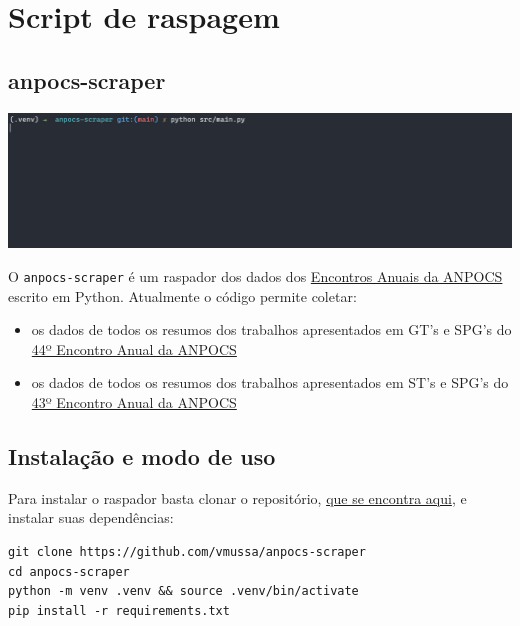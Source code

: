 \documentclass[
]{book}
\begin{document}
\hypertarget{script-de-raspagem}{%
\section{Script de raspagem}\label{script-de-raspagem}}

\hypertarget{anpocs-scraper}{%
\subsection{anpocs-scraper}\label{anpocs-scraper}}

\includegraphics{img/demo.gif}

O \texttt{anpocs-scraper} é um raspador dos dados dos \href{http://anpocs.com/index.php/encontros/apresentacao}{Encontros Anuais da ANPOCS} escrito em Python. Atualmente o código permite coletar:

\begin{itemize}
\item
  os dados de todos os resumos dos trabalhos apresentados em GT's e SPG's do \href{https://www.anpocs2020.sinteseeventos.com.br/}{44º Encontro Anual da ANPOCS}
\item
  os dados de todos os resumos dos trabalhos apresentados em ST's e SPG's do \href{http://anpocs.com/index.php/43-encontro-anual-2019/2750-encontros-anuais/43-encontro/2301-resumos-sts-e-spgs}{43º Encontro Anual da ANPOCS}
\end{itemize}

\hypertarget{instalauxe7uxe3o-e-modo-de-uso}{%
\subsection{Instalação e modo de uso}\label{instalauxe7uxe3o-e-modo-de-uso}}

Para instalar o raspador basta clonar o repositório, \href{https://github.com/vmussa/anpocs-scraper}{que se encontra aqui}, e instalar suas dependências:

\begin{verbatim}
git clone https://github.com/vmussa/anpocs-scraper
cd anpocs-scraper
python -m venv .venv && source .venv/bin/activate
pip install -r requirements.txt
\end{verbatim}
\end{document}
